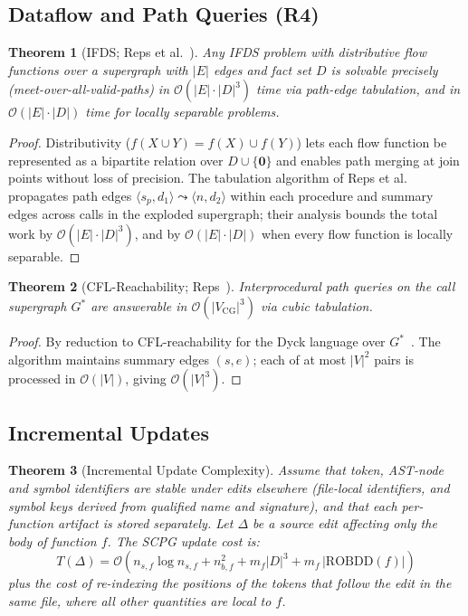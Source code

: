 \documentclass[journal,10pt,twoside]{IEEEtran}
\newtheorem{theorem}{Theorem}[section]
\newcommand{\ROBDD}{\mathrm{ROBDD}}
\newcommand{\BigO}{\mathcal{O}}
\begin{document}
\subsection{Dataflow and Path Queries (R4)}

\begin{theorem}[IFDS; Reps et al.~\cite{reps95}]\label{thm:ifds}
Any IFDS problem with distributive flow functions over
a supergraph with $|E|$ edges and fact set $D$ is solvable
precisely (meet-over-all-valid-paths) in
$\BigO(|E| \cdot |D|^3)$ time via path-edge tabulation, and
in $\BigO(|E| \cdot |D|)$ time for locally separable
problems.
\end{theorem}

\begin{proof}
Distributivity ($f(X \cup Y) = f(X) \cup f(Y)$) lets each
flow function be represented as a bipartite relation over
$D \cup \{\mathbf{0}\}$ and enables path merging at join
points without loss of precision.  The tabulation algorithm
of Reps et al.~\cite{reps95} propagates path edges
$\langle s_p, d_1\rangle \leadsto \langle n, d_2\rangle$
within each procedure and summary edges across calls in the
exploded supergraph; their analysis bounds the total work by
$\BigO(|E|\cdot|D|^3)$, and by $\BigO(|E|\cdot|D|)$ when every
flow function is locally separable.
\end{proof}

\begin{theorem}[CFL-Reachability; Reps~\cite{reps97}]
\label{thm:cfl}
Interprocedural path queries on the call supergraph $G^*$
are answerable in $\BigO(|V_{\mathrm{CG}}|^3)$ via cubic
tabulation.
\end{theorem}

\begin{proof}
By reduction to CFL-reachability for the Dyck language
over $G^*$~\cite{reps97}.  The algorithm maintains summary
edges $(s,e)$; each of at most $|V|^2$ pairs is processed
in $\BigO(|V|)$, giving $\BigO(|V|^3)$.
\end{proof}

\subsection{Incremental Updates}

\begin{theorem}[Incremental Update Complexity]\label{thm:incr}
Assume that token, AST-node and symbol identifiers are stable
under edits elsewhere (file-local identifiers, and symbol keys
derived from qualified name and signature), and that each
per-function artifact is stored separately.  Let $\Delta$ be a
source edit affecting only the body of function $f$.  The SCPG
update cost is:
\[
  T(\Delta) = \BigO\!\left(n_{s,f}\log n_{s,f}
    + n_{b,f}^2 + m_f|D|^3
    + m_f\,|\ROBDD(f)|\right)
\]
plus the cost of re-indexing the positions of the tokens that
follow the edit in the same file, where all other quantities
are local to $f$.
\end{theorem}
\end{document}
